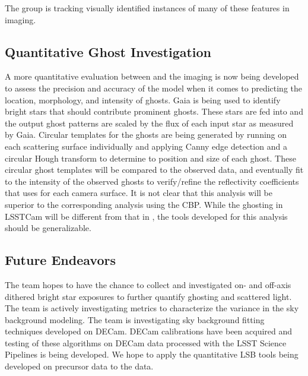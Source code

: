 The group is tracking visually identified instances of many of these features in \ComCam imaging.

\subsection{Quantitative Ghost Investigation}

A more quantitative evaluation between \Batoid and the \ComCam imaging is now being developed to assess the
precision and accuracy of the \Batoid model when it comes to predicting the location, morphology, and
intensity of ghosts. Gaia is being used to identify bright stars that should contribute prominent
ghosts. These stars are fed into \Batoid and the output ghost patterns are scaled by the flux of each input
star as measured by Gaia. Circular templates for the ghosts are being generated by running \Batoid on each
scattering surface individually and applying Canny edge detection and a circular Hough transform to determine
to position and size of each ghost. These circular ghost templates will be compared to the observed data, and
eventually fit to the intensity of the observed ghosts to verify/refine the reflectivity coefficients that
\Batoid uses for each camera surface.  It is not clear that this analysis will be superior to the
corresponding analysis using the CBP.
While the ghosting in LSSTCam will be different from that in \ComCam, the tools developed for this analysis should be generalizable.

\subsection{Future Endeavors}

The team hopes to have the chance to collect and investigated on- and off-axis dithered bright star exposures to further quantify ghosting and scattered light. The team is actively investigating metrics to characterize the variance in the sky background modeling. The team is investigating sky background fitting techniques developed on DECam. DECam calibrations have been acquired and testing of these algorithms on DECam data processed with the LSST Science Pipelines is being developed. We hope to apply the quantitative LSB tools being developed on precursor data to the \ComCam data.
